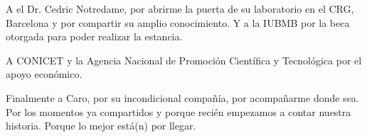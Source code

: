 \begin{acknowledgements}
A el Dr. Cedric Notredame, por abrirme la puerta de su laboratorio en el CRG, Barcelona y por compartir su amplio conocimiento.
Y a la IUBMB por la beca otorgada para poder realizar la estancia.

A CONICET y la Agencia Nacional de Promoción Científica y Tecnológica por el apoyo económico.

Finalmente a Caro, por su incondicional compañía, por acompañarme donde sea.
Por los momentos ya compartidos y porque recién empezamos a contar nuestra historia.
Porque lo mejor está(n) por llegar.

\end{acknowledgements}
